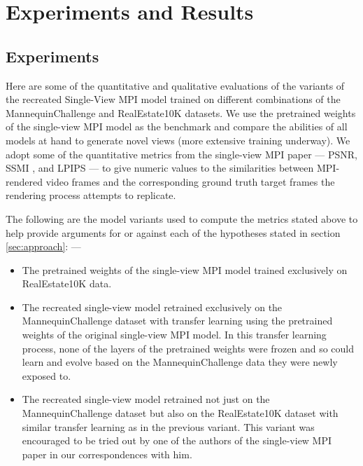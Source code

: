 \chapter{Experiments and Results}\label{ch4:experiments-results}

\section{Experiments}\label{sec:experiments} 

Here are some of the quantitative and qualitative evaluations of the variants of the recreated Single-View MPI model trained on different combinations of the MannequinChallenge and RealEstate10K datasets. We use the pretrained weights of the single-view MPI model as the benchmark and compare the abilities of all models at hand to generate novel views (more extensive training underway). We adopt some of the quantitative metrics from the single-view MPI paper \cite{single_view_mpi} --- PSNR, SSMI \cite{wang_image_2004}, and LPIPS \cite{zhang_unreasonable_2018} --- to give numeric values to the similarities between MPI-rendered video frames and the corresponding ground truth target frames the rendering process attempts to replicate. 

The following are the model variants used to compute the metrics stated above to help provide arguments for or against each of the hypotheses stated in section \ref{sec:approach}: ---
\begin{itemize}
    \item The pretrained weights of the single-view MPI model trained exclusively on RealEstate10K data.
    \item The recreated single-view model retrained exclusively on the MannequinChallenge dataset with transfer learning using the pretrained weights of the original single-view MPI model. In this transfer learning process, none of the layers of the pretrained weights were frozen and so could learn and evolve based on the MannequinChallenge data they were newly exposed to.
    \item The recreated single-view model retrained not just on the MannequinChallenge dataset but also on the RealEstate10K dataset with similar transfer learning as in the previous variant. This variant was encouraged to be tried out by one of the authors of the single-view MPI paper in our correspondences with him. \cite{single_view_mpi}
\end{itemize}

